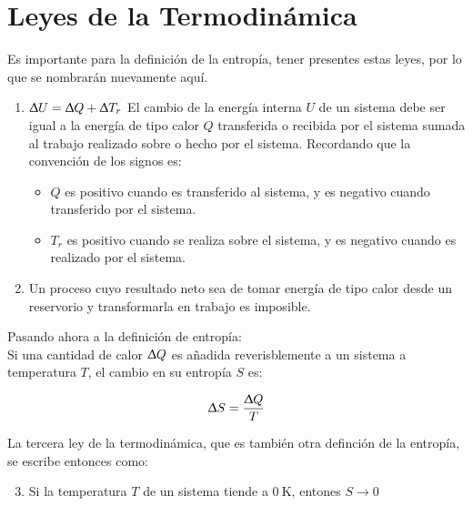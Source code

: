 \section{Leyes de la Termodinámica}

Es importante para la definición de la entropía, tener presentes estas
leyes, por lo que se nombrarán nuevamente aquí.

\begin{enumerate}
  \item $\Updelta U = \Updelta Q + \Updelta T_r$
        El cambio de la energía interna $U$ de un sistema debe ser
        igual a la energía de tipo calor $Q$ transferida o recibida por
        el sistema sumada al trabajo realizado sobre o hecho por el
        sistema. Recordando que la convención de los signos es:
        \begin{itemize}
          \item $Q$ es positivo cuando es transferido al sistema, y es
                negativo cuando transferido por el sistema.
          \item $T_r$ es positivo cuando se realiza sobre el sistema, y
                es negativo cuando es realizado por el sistema.
        \end{itemize}
  \item Un proceso cuyo resultado neto sea de tomar energía de tipo
        calor desde un reservorio y transformarla en trabajo es
        imposible.
\end{enumerate}

Pasando ahora a la definición de entropía:\\
Si una cantidad de calor $\Updelta Q$ es añadida reverisblemente a un
sistema a temperatura $T$, el cambio en su entropía $S$ es:

\[\Updelta S = \frac{\Updelta Q}{T}\]

La tercera ley de la termodinámica, que es también otra definción de la
entropía, se escribe entonces como:

\begin{enumerate}
  \setcounter{enumi}{2}
  \item Si la temperatura $T$ de un sistema tiende a $\qty{0}{\kelvin}$,
        entones $S \to 0$
\end{enumerate}

